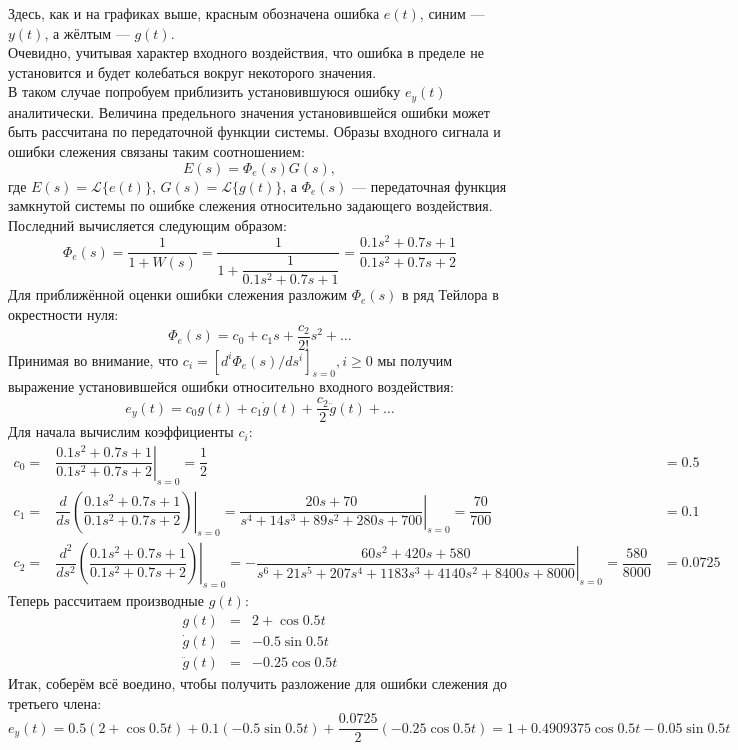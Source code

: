 \documentclass[a4paper]{article}
\begin{document}
Здесь, как и на графиках выше, красным обозначена ошибка $e(t)$, синим --- $y(t)$, а жёлтым --- $g(t)$.\\[0.5em]
Очевидно, учитывая характер входного воздействия, что ошибка в пределе не установится и будет колебаться вокруг некоторого значения.\\[0.5em]
В таком случае попробуем приблизить установившуюся ошибку $e_y(t)$ аналитически. Величина предельного значения установившейся ошибки может быть рассчитана по передаточной функции системы. Образы входного сигнала и ошибки слежения связаны таким соотношением:
$$E(s) = \Phi_e(s)G(s),$$
где $E(s) = \mathcal{L}\{e(t)\}$, $G(s) = \mathcal{L}\{g(t)\}$, а $\Phi_e(s)$ --- передаточная функция замкнутой системы по ошибке слежения относительно задающего воздействия. Последний вычисляется следующим образом:
$$\Phi_e(s) = \frac{1}{1 + W(s)} = \frac{1}{1 + \dfrac{1}{0.1s^2+0.7s+1}} = \frac{0.1s^2 + 0.7s + 1}{0.1s^2 + 0.7s + 2}$$
Для приближённой оценки ошибки слежения разложим $\Phi_e(s)$ в ряд Тейлора в окрестности нуля:
$$\Phi_e(s) = c_0 + c_1s + \frac{c_2}{2!}s^2 + \ldots$$
Принимая во внимание, что $c_i = \left[ d^i\Phi_e(s)/ds^i \right]_{s=0}, i\geqslant 0$ мы получим выражение установившейся ошибки относительно входного воздействия:
$$e_y(t) = c_0g(t) + c_1\dot{g}(t) + \frac{c_2}{2}\ddot{g}(t) + \ldots$$
Для начала вычислим коэффициенты $c_i$:
\begin{eqnarray*}
    c_0 =& \left. \dfrac{0.1s^2 + 0.7s + 1}{0.1s^2 + 0.7s + 2} \right|_{s=0} = \dfrac{1}{2} &= 0.5 \\
    c_1 =& \left. \dfrac{d}{ds}\left( \dfrac{0.1s^2 + 0.7s + 1}{0.1s^2 + 0.7s + 2} \right) \right|_{s=0} = \left.\dfrac{20s+70}{s^4+14s^3+89s^2+280s+700}\right|_{s=0} = \dfrac{70}{700} &= 0.1 \\
    c_2 =& \left. \dfrac{d^2}{ds^2}\left( \dfrac{0.1s^2 + 0.7s + 1}{0.1s^2 + 0.7s + 2} \right) \right|_{s=0} = \left. -\dfrac{60s^{2}+420s+580}{s^{6}+21s^{5}+207s^{4}+1183s^{3}+4140s^{2}+8400s+8000} \right|_{s=0}= \dfrac{580}{8000} &= 0.0725
\end{eqnarray*}
Теперь рассчитаем производные $g(t)$:
\begin{eqnarray*}
    g(t) &=& 2 + \cos{0.5t} \\
    \dot{g}(t) &=& -0.5\sin{0.5t} \\
    \ddot{g}(t) &=& -0.25\cos{0.5t}
\end{eqnarray*}
Итак, соберём всё воедино, чтобы получить разложение для ошибки слежения до третьего члена:
$$e_y(t) = 0.5\left( 2 + \cos{0.5t} \right) + 0.1(-0.5\sin{0.5t}) + \frac{0.0725}{2}(-0.25\cos{0.5t}) = 1 + 0.4909375\cos{0.5t} - 0.05\sin{0.5t}$$
\end{document}
